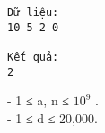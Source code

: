 \begin{verbatim}
Dữ liệu:
10 5 2 0

Kết quả:
2
\end{verbatim}
- 1 ≤ a, n ≤ $10^{9}$   .   
\\   - 1 ≤ d ≤ 20,000.